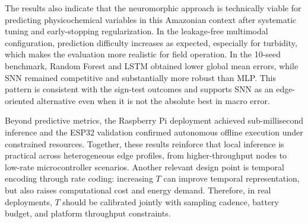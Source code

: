 The results also indicate that the neuromorphic approach is technically viable for predicting physicochemical variables in this Amazonian context after systematic tuning and early-stopping regularization. In the leakage-free multimodal configuration, prediction difficulty increases as expected, especially for turbidity, which makes the evaluation more realistic for field operation. In the 10-seed benchmark, Random Forest and LSTM obtained lower global mean errors, while SNN remained competitive and substantially more robust than MLP. This pattern is consistent with the sign-test outcomes and supports SNN as an edge-oriented alternative even when it is not the absolute best in macro error.

Beyond predictive metrics, the Raspberry Pi deployment achieved sub-millisecond inference and the ESP32 validation confirmed autonomous offline execution under constrained resources. Together, these results reinforce that local inference is practical across heterogeneous edge profiles, from higher-throughput nodes to low-rate microcontroller scenarios. Another relevant design point is temporal encoding through rate coding: increasing $T$ can improve temporal representation, but also raises computational cost and energy demand. Therefore, in real deployments, $T$ should be calibrated jointly with sampling cadence, battery budget, and platform throughput constraints.
